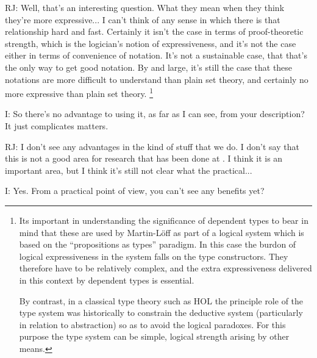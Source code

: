 \documentclass[10pt,titlepage]{book}
\def\ouml{\"o}
\begin{document}
RJ: Well, that's an interesting question.
What they mean when they think they're more expressive...
I can't think of any sense in which there is that relationship hard and fast.
Certainly it isn't the case in terms of proof-theoretic strength, which is the logician's notion of expressiveness, and it's not the case either in terms of convenience of notation.
It's not a sustainable case, that that's the only way to get good notation.
By and large, it's still the case that these notations are more difficult to understand than plain set theory, and certainly no more expressive than plain set theory.
\footnote{
Its important in understanding the significance of dependent types to bear in mind that these are used by Martin-L\"off\index{Martin-L{\ouml}ff} as part of a logical system which is based on the ``propositions as types'' paradigm.
In this case the burdon of logical expressiveness in the system falls on the type constructors.
They therefore have to be relatively complex, and the extra expressiveness delivered in this context by dependent types is essential.

By contrast, in a classical type theory such as HOL the principle role of the type system was historically to constrain the deductive system (particularly in relation to abstraction) so as to avoid the logical paradoxes.
For this purpose the type system can be simple, logical strength arising by other means.
}

I: So there's no advantage to using it, as far as I can see, from your description?
It just complicates matters.

RJ: I don't see any advantages in the kind of stuff that we do.
I don't say that this is not a good area for research that has been done at	.
I think it is an important area, but I think it's still not clear what the practical...

I: Yes. From a practical point of view, you can't see any benefits yet?
\end{document}
